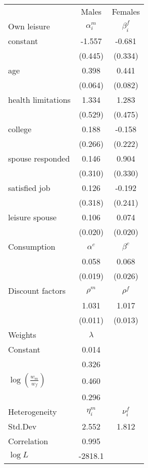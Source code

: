 \begin{tabular}{lcc} 
\hline\hline 
 & Males & Females \\ 
Own leisure & $\alpha_{i}^{m}$ & $\beta_{i}^{f}$ \\ 
constant & -1.557 & -0.681 \\ 
 & (0.445) & (0.334) \\ 
age & 0.398 & 0.441 \\ 
 & (0.064) & (0.082) \\ 
health limitations & 1.334 & 1.283 \\ 
 & (0.529) & (0.475) \\ 
college & 0.188 & -0.158 \\ 
 & (0.266) & (0.222) \\ 
spouse responded & 0.146 & 0.904 \\ 
 & (0.310) & (0.330) \\ 
satisfied job & 0.126 & -0.192 \\ 
 & (0.318) & (0.241) \\ 
leisure spouse & 0.106 & 0.074 \\ 
 & (0.020) & (0.020) \\ 
Consumption & $\alpha^{c}$ & $\beta^{c}$ \\ 
 & 0.058 & 0.068 \\ 
 & (0.019) & (0.026) \\ 
Discount factors & $\rho^m$ & $\rho^f$ \\ 
 & 1.031 & 1.017 \\ 
 & (0.011) & (0.013) \\ 
Weights & $\lambda$ &  \\ 
Constant & 0.014 &  \\ 
 & 0.326 &  \\ 
$\log(\frac{w_m}{w_f})$ & 0.460 &  \\ 
 & 0.296 &  \\ 
Heterogeneity & $\eta_i^m$ & $\nu_i^f$ \\ 
Std.Dev & 2.552 & 1.812 \\ 
Correlation & 0.995 &  \\ 
\hline 
$\log L$ & -2818.1 & \\ 
\hline \hline 
\end{tabular} 
